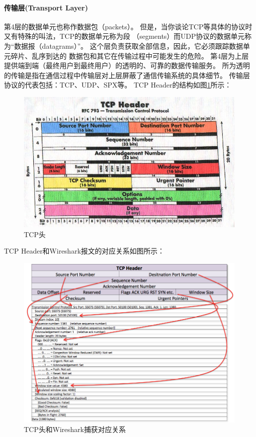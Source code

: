 \documentclass{book}
\begin{document}
\paragraph{传输层(Transport Layer)}第4层的数据单元也称作数据包（packets）。
但是，当你谈论TCP等具体的协议时又有特殊的叫法，TCP的数据单元称为段 （segments）而UDP协议的数据单元称为“数据报（datagrams）”。
这个层负责获取全部信息，因此，它必须跟踪数据单元碎片、乱序到达的 数据包和其它在传输过程中可能发生的危险。
第4层为上层提供端到端（最终用户到最终用户）的透明的、可靠的数据传输服务。
所为透明的传输是指在通信过程中传输层对上层屏蔽了通信传输系统的具体细节。
传输层协议的代表包括：TCP、UDP、SPX等。
TCP Header的结构如图\ref{fig:TCPHeaderStructure}所示：

\begin{figure}[htbp]
	\centering
	\includegraphics[scale=0.6]{TCPHeaderStructure.jpg}
	\caption{TCP头}
	\label{fig:TCPHeaderStructure}
\end{figure}


TCP Header和Wireshark报文的对应关系如图所示：

\begin{figure}[htbp]
	\centering
	\includegraphics[scale=0.4]{TCPHeaderAndWireshark.jpg}
	\caption{TCP头和Wireshark捕获对应关系}
	\label{fig:TCPHeaderAndWireshark}
\end{figure}
\end{document}
